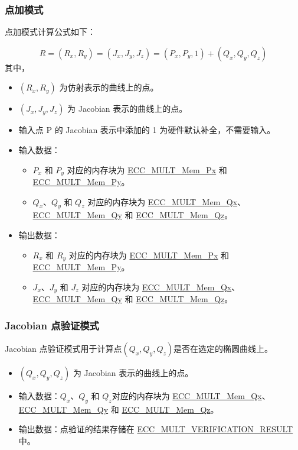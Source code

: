\documentclass[main\_\_CN.tex]{subfiles}
\begin{document}
\subsubsection{点加模式}

点加模式计算公式如下：

\[
R = (R_x,R_y) = (J_x,J_y,J_z) = (P_x,P_y,1) + (Q_x,Q_y,Q_z)
\]
其中，
\begin{itemize}
    \item $(R_x,R_y)$ 为仿射表示的曲线上的点。
    \item $(J_x,J_y,J_z)$ 为 Jacobian 表示的曲线上的点。
    \item 输入点 P 的 Jacobian 表示中添加的 1 为硬件默认补全，不需要输入。
    \item 输入数据：
    \begin{itemize}
        \item $P_x$ 和 $P_y$ 对应的内存块为 \hyperref[tab:ecc-memory]{ECC\_MULT\_Mem\_Px} 和 \hyperref[tab:ecc-memory]{ECC\_MULT\_Mem\_Py}。
        \item $Q_x$、$Q_y$ 和 $Q_z$ 对应的内存块为 \hyperref[tab:ecc-memory]{ECC\_MULT\_Mem\_Qx}、\hyperref[tab:ecc-memory]{ECC\_MULT\_Mem\_Qy} 和 \hyperref[tab:ecc-memory]{ECC\_MULT\_Mem\_Qz}。
    \end{itemize}
    \item 输出数据：
    \begin{itemize}
        \item $R_x$ 和 $R_y$ 对应的内存块为 \hyperref[tab:ecc-memory]{ECC\_MULT\_Mem\_Px} 和 \hyperref[tab:ecc-memory]{ECC\_MULT\_Mem\_Py}。
        \item $J_x$、$J_y$ 和 $J_z$ 对应的内存块为 \hyperref[tab:ecc-memory]{ECC\_MULT\_Mem\_Qx}、\hyperref[tab:ecc-memory]{ECC\_MULT\_Mem\_Qy} 和 \hyperref[tab:ecc-memory]{ECC\_MULT\_Mem\_Qz}。
    \end{itemize}
\end{itemize}


\subsubsection{Jacobian 点验证模式}

Jacobian 点验证模式用于计算点$(Q_x,Q_y,Q_z)$是否在选定的椭圆曲线上。
\begin{itemize}
    \item $(Q_x,Q_y,Q_z)$ 为 Jacobian 表示的曲线上的点。
    \item 输入数据：$Q_x$、$Q_y$ 和 $Q_z$对应的内存块为 \hyperref[tab:ecc-memory]{ECC\_MULT\_Mem\_Qx}、\hyperref[tab:ecc-memory]{ECC\_MULT\_Mem\_Qy} 和 \hyperref[tab:ecc-memory]{ECC\_MULT\_Mem\_Qz}。
    \item 输出数据：点验证的结果存储在 \hyperref[fielddesc:ECCMULTVERIFICATIONRESULT]{ECC\_MULT\_VERIFICATION\_RESULT} 中。
\end{itemize}
\end{document}

